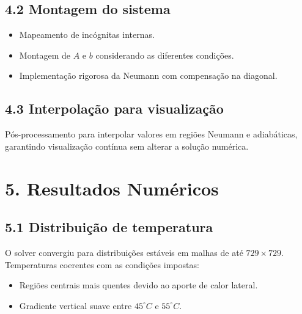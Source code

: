 \documentclass[12pt]{article}
\begin{document}
\subsection*{4.2 Montagem do sistema}

\begin{itemize}
    \item Mapeamento de incógnitas internas.
    \item Montagem de $A$ e $b$ considerando as diferentes condições.
    \item Implementação rigorosa da Neumann com compensação na diagonal.
\end{itemize}

\subsection*{4.3 Interpolação para visualização}

Pós-processamento para interpolar valores em regiões Neumann e adiabáticas, garantindo visualização contínua sem alterar a solução numérica.

\section*{5. Resultados Numéricos}

\subsection*{5.1 Distribuição de temperatura}

O solver convergiu para distribuições estáveis em malhas de até $729 \times 729$.  
Temperaturas coerentes com as condições impostas:
\begin{itemize}
    \item Regiões centrais mais quentes devido ao aporte de calor lateral.
    \item Gradiente vertical suave entre $45^\circ C$ e $55^\circ C$.
\end{itemize}
\end{document}
